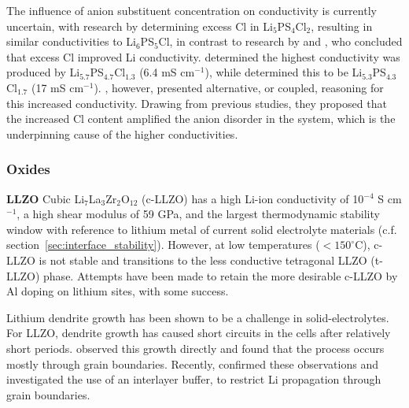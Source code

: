 \documentclass[../main.tex]{subfiles}
\begin{document}
The influence of anion substituent concentration on conductivity is currently uncertain, with research by \citeauthor{deklerk2016} determining excess Cl in Li$_5$PS$_4$Cl$_2$, resulting in similar conductivities to Li$_6$PS$_5$Cl,\cite{deklerk2016} in contrast to research by \citeauthor{yu2019tailoring} and \citeauthor{Feng_2020}, who concluded that excess Cl improved Li conductivity.\cite{yu2019tailoring,Feng_2020} \citeauthor{yu2019tailoring} determined the highest conductivity was produced by Li$_{5.7}$PS$_{4.7}$Cl$_{1.3}$ (6.4 mS cm$^{-1}$), \cite{yu2019tailoring,yu_superionic_2020} while \citeauthor{Feng_2020} determined this to be Li$_{5.3}$PS$_{4.3}$Cl$_{1.7}$ (17 mS cm$^{-1}$).\cite{Feng_2020} \citeauthor{Feng_2020}, however, presented alternative, or coupled, reasoning for this increased conductivity. Drawing from previous studies,\cite{adeli2019,zhou_solvent-engineered_2019} they proposed that the increased Cl content amplified the anion disorder in the system, which is the underpinning cause of the higher conductivities.

\subsubsection{Oxides}
\label{sec:se_oxides}
\textbf{LLZO} Cubic Li$_7$La$_3$Zr$_2$O$_{12}$ (c-LLZO) has a high Li-ion conductivity of 10$^{-4}$ S cm$^{-1}$,\cite{Murugan2007} a high shear modulus of 59 GPa,\cite{Ni2012} and the largest thermodynamic stability window with reference to lithium metal\cite{Zhu2016, Zhu2015, Binninger2020} of current solid electrolyte materials (c.f. section~\ref{sec:interface_stability}). However, at low temperatures ($<150 ^\circ$C), c-LLZO is not stable and transitions to the less conductive tetragonal LLZO (t-LLZO) phase.\cite{Geiger2011} Attempts have been made to retain the more desirable c-LLZO by Al doping on lithium sites, with some success.\cite{Geiger2011, Rangasamy2012}

Lithium dendrite growth has been shown to be a challenge in solid-electrolytes. For LLZO, dendrite growth has caused short circuits in the cells after relatively short periods.\cite{Ren2015,Sudo2014} \citeauthor{Cheng2017} observed this growth directly and found that the process occurs mostly through grain boundaries.\cite{Cheng2017} Recently, \citeauthor{Kim2020} confirmed these observations and investigated the use of an interlayer buffer, to restrict Li propagation through grain boundaries.\cite{Kim2020}
\end{document}
